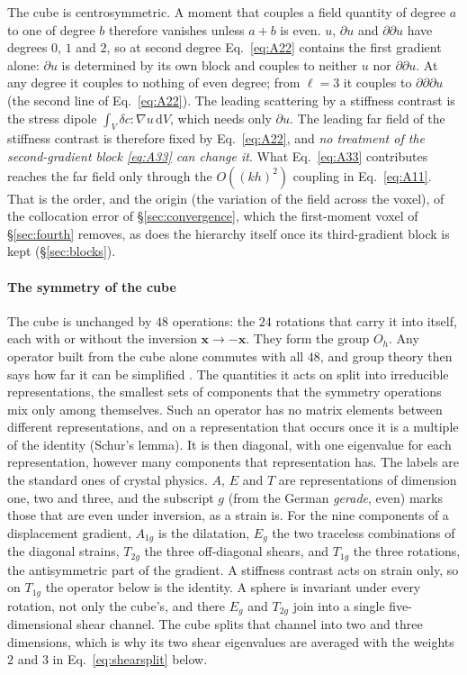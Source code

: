 \documentclass[preprint,review,12pt]{elsarticle}
\newcommand{\dd}{\mathrm{d}}
\begin{document}
The cube is centrosymmetric. A moment that couples a field quantity of degree $a$ to one of degree
$b$ therefore vanishes unless $a+b$ is even. $u$, $\partial u$ and $\partial\partial u$ have
degrees $0$, $1$ and $2$, so at second degree Eq.~\eqref{eq:A22} contains the first gradient alone:
$\partial u$ is determined by its own block and couples to neither $u$ nor $\partial\partial u$. At
any degree it couples to nothing of even degree; from $\ell=3$ it couples to $\partial\partial\partial u$
(the second line of Eq.~\eqref{eq:A22}). The leading
scattering by a stiffness contrast is the stress dipole $\int_V\delta c:\nabla u\,\dd V$, which needs
only $\partial u$. The leading far field of the stiffness contrast is therefore fixed by
Eq.~\eqref{eq:A22}, and \emph{no treatment of the second-gradient block \eqref{eq:A33} can change
it}. What Eq.~\eqref{eq:A33} contributes reaches the far field only through the $O((kh)^2)$
coupling in Eq.~\eqref{eq:A11}. That is the order, and the origin (the variation of the field
across the voxel), of the collocation error of \S\ref{sec:convergence}, which the first-moment
voxel of \S\ref{sec:fourth} removes, as does the hierarchy itself once its third-gradient block is kept
(\S\ref{sec:blocks}).

\paragraph{The symmetry of the cube} The cube is unchanged by $48$ operations: the $24$ rotations
that carry it into itself, each with or without the inversion $\mathbf x\to-\mathbf x$. They form the
group $O_h$. Any operator built from the cube alone commutes with all $48$, and group theory then says
how far it can be simplified \citep{Tinkham1964,Dresselhaus2008}. The quantities it acts on split into
irreducible representations, the smallest sets of components that the symmetry operations mix only among
themselves. Such an operator has no matrix elements between different representations, and on a
representation that occurs once it is a multiple of the identity (Schur's lemma). It is then diagonal,
with one eigenvalue for each representation, however many components that representation has. The
labels are the standard ones of crystal physics. $A$, $E$ and $T$ are representations of dimension one,
two and three, and the subscript $g$ (from the German \emph{gerade}, even) marks those that are even under
inversion, as a strain is. For the nine components of a displacement gradient, $A_{1g}$ is the dilatation,
$E_g$ the two traceless combinations of the diagonal strains, $T_{2g}$ the three off-diagonal shears, and
$T_{1g}$ the three rotations, the antisymmetric part of the gradient. A stiffness contrast acts on strain
only, so on $T_{1g}$ the operator below is the identity. A sphere is invariant under every rotation, not
only the cube's, and there $E_g$ and $T_{2g}$ join into a single five-dimensional shear channel. The cube
splits that channel into two and three dimensions, which is why its two shear eigenvalues are averaged
with the weights $2$ and $3$ in Eq.~\eqref{eq:shearsplit} below.
\end{document}
